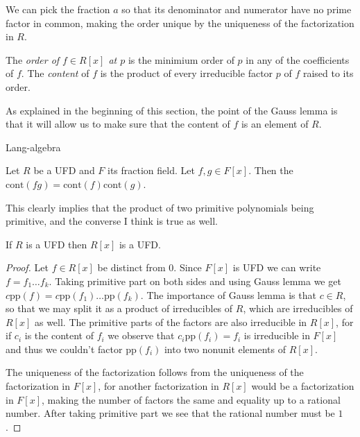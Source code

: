 We can pick the fraction $a$ so that its denominator and numerator have no prime
factor in common, making the order unique by the uniqueness of the factorization
in $R$.

\begin{definition}
\label{definition-content}
\begin{reference}
\cite[p. 181]{Lang-algebra}
\end{reference}
The {\it  order of $f\in R[x]$ at $p$} is the minimium order of
$p$ in any of the coefficients of $f$. The {\it content} of $f$ is the product
of every irreducible factor $p$ of $f$ raised to its order.
\end{definition}

As explained in the beginning of this section, the point of the Gauss
lemma is that it will allow us to make sure that the content of $f$ is an
element of $R$.

\begin{lemma}
\label{lemma-true-Gauss}
\begin{reference}
\cite{Chapter 4, Theorem 2.1}{Lang-algebra}
\end{reference}
Let $R$ be a UFD and $F$ its fraction field. Let $f,g\in F[x]$. Then the
$\text{cont}(fg)=\text{cont}(f)\text{cont}(g)$.
\end{lemma}

This clearly implies that the product of two primitive polynomials being
primitive, and the converse I think is true as well.

\begin{lemma}
\label{lemma-R-UFD-implies-R[x]-UFD}
\begin{reference}
\cite[Chapter 4, Theorem 2.3]{Lang-algebra}
\end{reference}
If $R$ is a UFD then $R[x]$ is a UFD.
\end{lemma}

\begin{proof}
Let $f\in R[x]$ be distinct from 0. Since $F[x]$ is UFD we can write
$f=f_1\ldots f_k$. Taking primitive part on both sides and using Gauss lemma we
get $c\text{pp}(f)=c \text{pp}(f_1)\ldots\text{pp}(f_k)$. The importance of
Gauss lemma is that $c \in R$, so that we may split it as a product of
irreducibles of $R$, which are irreducibles of $R[x]$ as well. The primitive
parts of the factors are also irreducible in $R[x]$, for if $c_i$ is the content
of $f_i$ we observe that $c_i\text{pp}(f_i)=f_i$ is irreducible in $F[x]$ and
thus we couldn't factor $\text{pp}(f_i)$ into two nonunit elements of $R[x]$.

The uniqueness of the factorization follows from the uniqueness of the
factorization in $F[x]$, for another factorization in $R[x]$ would be a
factorization in $F[x]$, making the number of factors the same and equality up
to a rational number. After taking primitive part we see that the rational
number must be $1$.
\end{proof}

